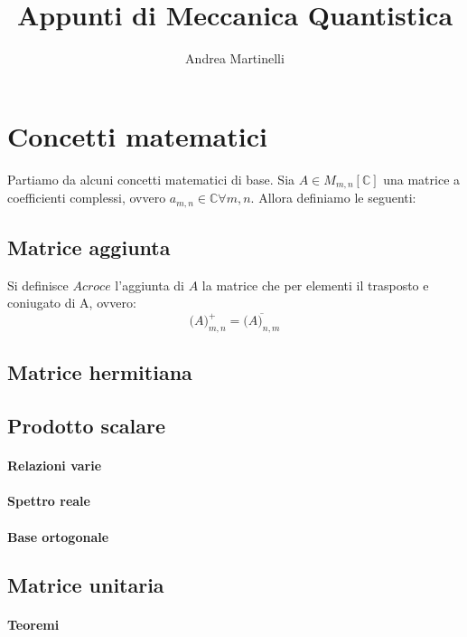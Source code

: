 \documentclass[]{article}
\title{Appunti di Meccanica Quantistica}
\author{Andrea Martinelli}
\begin{document}
\maketitle

\begin{abstract}
\end{abstract}



\section{Concetti matematici}
Partiamo da alcuni concetti matematici di base. Sia $A \in M_{m,n}[ \mathbb{C}]$ una matrice a coefficienti complessi, ovvero $a_{m,n} \in \mathbb{C} \forall m,n$. Allora definiamo le seguenti:
\subsection{Matrice aggiunta}
Si definisce $Acroce$ l'aggiunta di $A$ la matrice che per elementi il trasposto e coniugato di A, ovvero:
\begin{equation}
	\big(A\big)^+_{m,n} = \overline{\big(A\big)_{n,m}}
\end{equation}
\subsection{Matrice hermitiana}
\subsection{Prodotto scalare}
	\paragraph{Relazioni varie}
		
	\paragraph{Spettro reale}
	\paragraph{Base ortogonale}

\subsection{Matrice unitaria}
	\paragraph{Teoremi}
	
\end{document}
